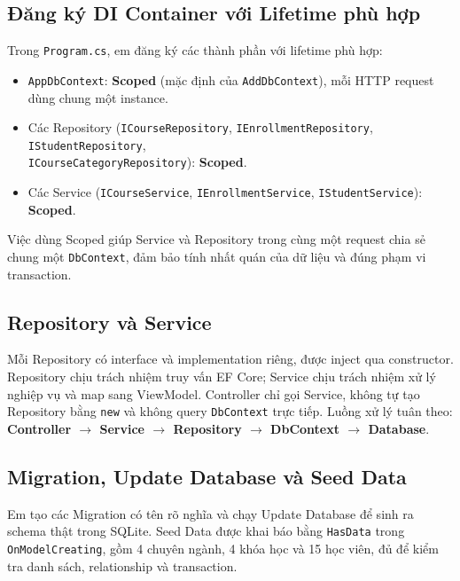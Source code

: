 \subsection{Đăng ký DI Container với Lifetime phù hợp}

Trong \texttt{Program.cs}, em đăng ký các thành phần với lifetime phù hợp:

\begin{itemize}[leftmargin = 0.6cm, label = -]
    \item \texttt{AppDbContext}: \textbf{Scoped} (mặc định của \texttt{AddDbContext}), mỗi HTTP request dùng chung một instance.
    \item Các Repository (\texttt{ICourseRepository}, \texttt{IEnrollmentRepository}, \texttt{IStudentRepository}, \\ \texttt{ICourseCategoryRepository}): \textbf{Scoped}.
    \item Các Service (\texttt{ICourseService}, \texttt{IEnrollmentService}, \texttt{IStudentService}): \textbf{Scoped}.
\end{itemize}

Việc dùng Scoped giúp Service và Repository trong cùng một request chia sẻ chung một \texttt{DbContext}, đảm bảo tính nhất quán của dữ liệu và đúng phạm vi transaction.

\subsection{Repository và Service}

Mỗi Repository có interface và implementation riêng, được inject qua constructor. Repository chịu trách nhiệm truy vấn EF Core; Service chịu trách nhiệm xử lý nghiệp vụ và map sang ViewModel. Controller chỉ gọi Service, không tự tạo Repository bằng \texttt{new} và không query \texttt{DbContext} trực tiếp. Luồng xử lý tuân theo: \textbf{Controller $\rightarrow$ Service $\rightarrow$ Repository $\rightarrow$ DbContext $\rightarrow$ Database}.

\subsection{Migration, Update Database và Seed Data}

Em tạo các Migration có tên rõ nghĩa và chạy Update Database để sinh ra schema thật trong SQLite. Seed Data được khai báo bằng \texttt{HasData} trong \texttt{OnModelCreating}, gồm 4 chuyên ngành, 4 khóa học và 15 học viên, đủ để kiểm tra danh sách, relationship và transaction.

